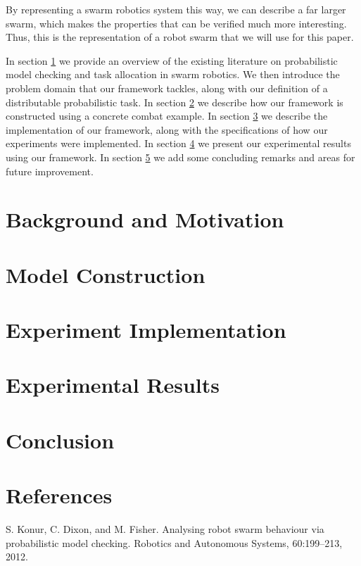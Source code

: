 \documentclass[11pt]{article}
\theoremstyle{definition}
\begin{document}
By representing a swarm robotics system this way,
we can describe a far larger swarm,
which makes the properties that can be verified
much more interesting. Thus, this is the representation
of a robot swarm that we will use for this paper.

In section \ref{sec:background-motivation} we provide an overview of the
existing literature on probabilistic model checking and
task allocation in swarm robotics. We then introduce
the problem domain that our framework tackles,
along with our definition of a distributable probabilistic
task. In section \ref{sec:model} we describe how our framework
is constructed using a concrete combat example. In section
\ref{sec:implementation} we describe the implementation of
our framework, along with the specifications of how our
experiments were implemented. In section \ref{sec:results}
we present our experimental results using our framework.
In section \ref{sec:conclusion} we add some concluding remarks
and areas for future improvement.

\section{Background and Motivation}\label{sec:background-motivation}


\section{Model Construction}\label{sec:model}

\section{Experiment Implementation}\label{sec:implementation}

\section{Experimental Results}\label{sec:results}

\section{Conclusion}\label{sec:conclusion}

\section{References}

\begin{thebibliography}{99}
        S. Konur, C. Dixon, and M. Fisher.
        Analysing robot swarm behaviour via
        probabilistic model checking.
        Robotics and Autonomous Systems, 60:199–213,
        2012.
\end{thebibliography}
\end{document}
